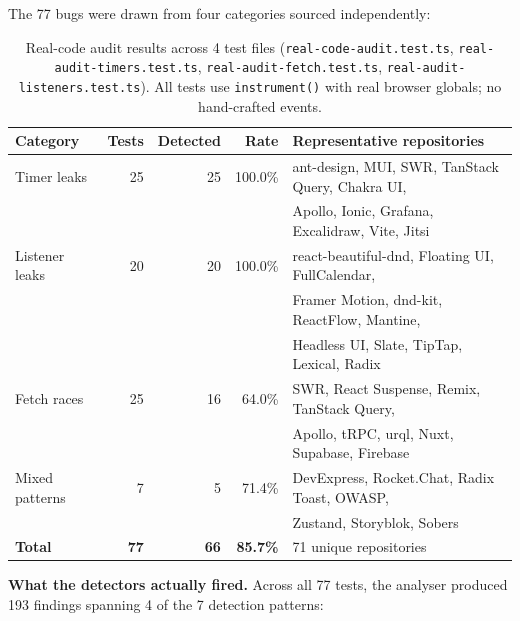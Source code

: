 \documentclass[11pt,a4paper]{article}
\begin{document}
The 77 bugs were drawn from four categories sourced independently:

\begin{table}[h]
\centering
\small
\begin{tabular}{lrrrl}
\toprule
\textbf{Category} & \textbf{Tests} & \textbf{Detected} & \textbf{Rate} & \textbf{Representative repositories} \\
\midrule
Timer leaks         & 25 & 25 & 100.0\% & ant-design, MUI, SWR, TanStack Query, Chakra UI, \\
                    &    &    &         & Apollo, Ionic, Grafana, Excalidraw, Vite, Jitsi \\
Listener leaks      & 20 & 20 & 100.0\% & react-beautiful-dnd, Floating UI, FullCalendar, \\
                    &    &    &         & Framer Motion, dnd-kit, ReactFlow, Mantine, \\
                    &    &    &         & Headless UI, Slate, TipTap, Lexical, Radix \\
Fetch races         & 25 & 16 & \phantom{0}64.0\%  & SWR, React Suspense, Remix, TanStack Query, \\
                    &    &    &         & Apollo, tRPC, urql, Nuxt, Supabase, Firebase \\
Mixed patterns      & \phantom{0}7  & \phantom{0}5  & \phantom{0}71.4\%  & DevExpress, Rocket.Chat, Radix Toast, OWASP, \\
                    &    &    &         & Zustand, Storyblok, Sobers \\
\midrule
\textbf{Total}      & \textbf{77} & \textbf{66} & \textbf{85.7\%} & 71 unique repositories \\
\bottomrule
\end{tabular}
\caption{Real-code audit results across 4 test files (\texttt{real-code-audit.test.ts}, \texttt{real-audit-timers.test.ts}, \texttt{real-audit-fetch.test.ts}, \texttt{real-audit-listeners.test.ts}). All tests use \texttt{instrument()} with real browser globals; no hand-crafted events.}
\label{tab:real-audit}
\end{table}

\textbf{What the detectors actually fired.} Across all 77 tests, the analyser produced 193 findings spanning 4 of the 7 detection patterns:
\end{document}
